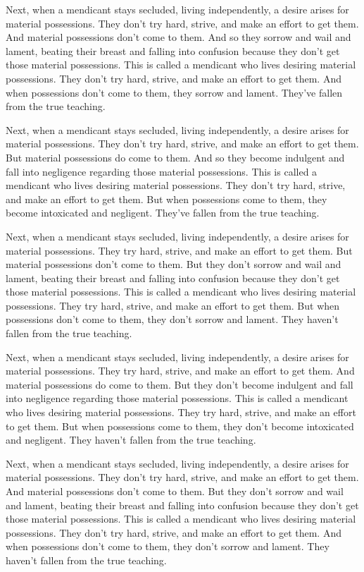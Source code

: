 \documentclass[12pt,openany]{book}%
\begin{document}
Next, when a mendicant stays secluded, living independently, a desire arises for material possessions. They don’t try hard, strive, and make an effort to get them. And material possessions don’t come to them. And so they sorrow and wail and lament, beating their breast and falling into confusion because they don’t get those material possessions. This is called a mendicant who lives desiring material possessions. They don’t try hard, strive, and make an effort to get them. And when possessions don’t come to them, they sorrow and lament. They’ve fallen from the true teaching. 

Next, when a mendicant stays secluded, living independently, a desire arises for material possessions. They don’t try hard, strive, and make an effort to get them. But material possessions do come to them. And so they become indulgent and fall into negligence regarding those material possessions. This is called a mendicant who lives desiring material possessions. They don’t try hard, strive, and make an effort to get them. But when possessions come to them, they become intoxicated and negligent. They’ve fallen from the true teaching. 

Next, when a mendicant stays secluded, living independently, a desire arises for material possessions. They try hard, strive, and make an effort to get them. But material possessions don’t come to them. But they don’t sorrow and wail and lament, beating their breast and falling into confusion because they don’t get those material possessions. This is called a mendicant who lives desiring material possessions. They try hard, strive, and make an effort to get them. But when possessions don’t come to them, they don’t sorrow and lament. They haven’t fallen from the true teaching. 

Next, when a mendicant stays secluded, living independently, a desire arises for material possessions. They try hard, strive, and make an effort to get them. And material possessions do come to them. But they don’t become indulgent and fall into negligence regarding those material possessions. This is called a mendicant who lives desiring material possessions. They try hard, strive, and make an effort to get them. But when possessions come to them, they don’t become intoxicated and negligent. They haven’t fallen from the true teaching. 

Next, when a mendicant stays secluded, living independently, a desire arises for material possessions. They don’t try hard, strive, and make an effort to get them. And material possessions don’t come to them. But they don’t sorrow and wail and lament, beating their breast and falling into confusion because they don’t get those material possessions. This is called a mendicant who lives desiring material possessions. They don’t try hard, strive, and make an effort to get them. And when possessions don’t come to them, they don’t sorrow and lament. They haven’t fallen from the true teaching. 
\end{document}
